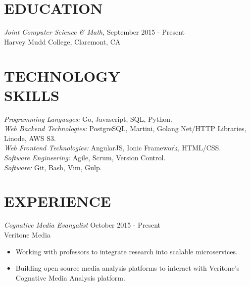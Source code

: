 \documentclass[margin, 10pt]{res} %
\begin{document}
\begin{resume}


\section{EDUCATION}

{\sl Joint Computer Science \& Math,}  \hfill September 2015 - Present \\
Harvey Mudd College, Claremont, CA\\
 

\section{TECHNOLOGY \\ SKILLS} 

{\sl Programming Languages:} Go, Javascript, SQL, Python. \\
{\sl Web Backend Technologies:} PostgreSQL, Martini, Golang Net/HTTP Libraries, Linode, AWS S3. \\
{\sl Web Frontend Technologies:} AngularJS, Ionic Framework, HTML/CSS. \\
{\sl Software Engineering:} Agile, Scrum, Version Control. \\
{\sl Software:} Git, Bash, Vim, Gulp. \\
 
 
\section{EXPERIENCE}

{\sl Cognative Media Evangalist} \hfill October 2015 - Present \\
Veritone Media
\begin{itemize}
\item Working with professors to integrate research into scalable microservices.
\item Building open source media analysis platforms to interact with Veritone's Cognative Media Analysis platform.
\end{itemize}


\end{resume}
\end{document}
